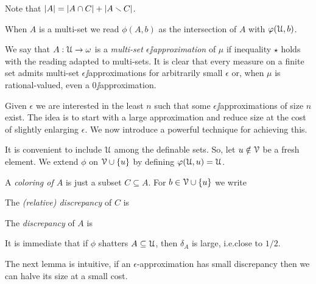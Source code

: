 \documentclass[combinatorics.tex]{subfiles}
\begin{document}

Note that $|A|=|A\cap C|+|A\smallsetminus C|$.

When $A$ is a multi-set we read \emph{$\phi(A,b)$\/} as the intersection of $A$ with $\varphi(\EuScript U,b)$.

We say that $A:\EuScript U\to\omega$ is a \emph{multi-set $\epsilon\jj$approximation\/} of $\mu$ if inequality $\star$ holds with the reading adapted to multi-sets.
It is clear that every measure on a finite set admits multi-set $\epsilon\jj$approximations for arbitrarily small $\epsilon$ or, when $\mu$ is rational-valued, even a $0\jj$approximation.


%  
% 

Given $\epsilon$ we are interested in the least $n$ such that some $\epsilon\jj$approximations of size $n$ exist.
The idea is to start with a large approximation and reduce size at the cost of slightly enlarging $\epsilon$.
We now introduce a powerful technique for achieving this.

It is convenient to include $\EuScript U$ among the definable sets. So, let $u\notin\EuScript V$ be a fresh element. We extend $\phi$ on $\EuScript V\cup\{u\}$ by defining \emph{$\varphi(\EuScript U,u)=\EuScript U$}. 

A \emph{coloring of $A$\/} is just a subset $C\subseteq A$.
For $b\in\EuScript V\cup\{u\}$ we write 


The \emph{(relative) discrepancy\/} of $C$ is\smallskip


The \emph{discrepancy\/} of $A$ is 


\smallskip
It is immediate that if $\phi$ shatters $A\subseteq\EuScript U$, then $\delta_A$ is large, i.e.\@ close to $1/2$.

The next lemma is intuitive, if an $\epsilon$-approximation has small discrepancy then we can halve its size at a small cost.
\end{document}

